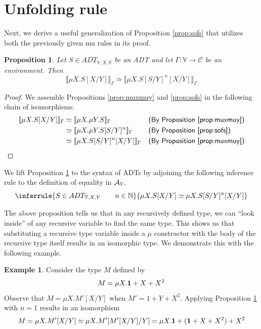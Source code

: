 \documentclass{msthesis}
\newtheorem{prop}[theorem]{Proposition}
\theoremstyle{definition}
\newtheorem{example}[theorem]{Example}
\newcommand{\semof}[1]{\llbracket{#1}\rrbracket}
\newcommand{\nat}{\mathbb{N}}
\newcommand{\mcC}{\mathcal{C}}
\newcommand{\vars}{\mathbb{V}}
\begin{document}
\section{Unfolding rule}

Next, we derive a useful generalization of Proposition \ref{prop:sofs} that utilizes both the previously given mu rules in its proof.

\begin{prop}\label{prop:arbitraryunfoldings}
    Let $S \in ADT_{\vars,X,Y}$ be an ADT and let $\Gamma : \vars \to \mcC$ be an environment. Then
    \[ \semof{\mu X.S[X/Y]}_\Gamma \simeq \semof{\mu X.S[S/Y]^n[X/Y]}_{\Gamma}  \]
\end{prop}
\begin{proof}
    We assemble Propositions \ref{prop:muxmuy} and \ref{prop:sofs} in the following chain of isomorphisms.
    \begin{align*}
        \semof{\mu X.S[X/Y]}_\Gamma
        &\simeq \semof{\mu X.\mu Y.S}_\Gamma && \textsf{(By Proposition \ref{prop:muxmuy})}\\
        &\simeq \semof{\mu X.\mu Y.S[S/Y]^n}_\Gamma && \textsf{(By Proposition \ref{prop:sofs})}\\
        &\simeq \semof{\mu X.S[S/Y]^n[X/Y]}_\Gamma  && \textsf{(By Proposition \ref{prop:muxmuy})}
    \end{align*}
\end{proof}

We lift Proposition \ref{prop:arbitraryunfoldings} to the syntax of ADTs by adjoining the following inference rule to the definition of equality in $\ADTrig$.
\begin{equation}\label{eq:arbitraryunfoldings}
    \inferrule{S \in ADT_{\vars, X, Y} \qquad n \in \nat}{\mu X.S[X/Y] \simeq \mu X.S[S/Y]^n[X/Y]}
\end{equation}

The above proposition tells us that in any recursively defined type, we can ``look inside'' of any recursive variable to find the same type.  This shows us that substituting a recursive type variable inside a $\mu$ constructor with the body of the recursive type itself results in an isomorphic type.  We demonstrate this with the following example.

\begin{example}
    Consider the type $M$ defined by
    \[ M = \mu X.\mathbf{1} + X + X^2 \]
    Observe that $M = \mu X.M'[X/Y]$ when $M' = 1 + Y + X^2$.
    Applying Proposition \ref{prop:arbitraryunfoldings} with $n=1$ results in an isomorphism
    \[ M = \mu X.M'[X/Y] \simeq \mu X.M'[M'[X/Y]/Y] = \mu X.\mathbf{1} + (\mathbf{1} + X + X^2) + X^2\]
\end{example}
\end{document}
